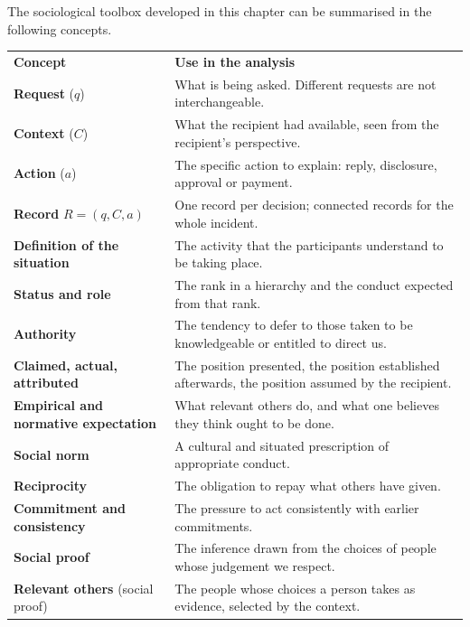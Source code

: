 The sociological toolbox developed in this chapter can be summarised in the following concepts.

\begin{table}[htbp]
	\centering
	\small
	\renewcommand{\arraystretch}{1.2}
	\begin{tabular}{@{}>{\raggedright\arraybackslash}p{} >{\raggedright\arraybackslash}p{}@{}}
		\arrayrulecolor{black!70}\hline
		\textbf{Concept} & \textbf{Use in the analysis} \\
		\arrayrulecolor{black!20}\hline
		\textbf{Request} ($q$) & What is being asked. Different requests are not interchangeable. \\
		\hline
		\textbf{Context} ($C$) & What the recipient had available, seen from the recipient's perspective. \\
		\hline
		\textbf{Action} ($a$) & The specific action to explain: reply, disclosure, approval or payment. \\
		\hline
		\textbf{Record} $R = (q, C, a)$ & One record per decision; connected records for the whole incident. \\
		\hline
		\textbf{Definition of the situation} & The activity that the participants understand to be taking place. \\
		\hline
		\textbf{Status and role} & The rank in a hierarchy and the conduct expected from that rank. \\
		\hline
		\textbf{Authority} & The tendency to defer to those taken to be knowledgeable or entitled to direct us. \\
		\hline
		\textbf{Claimed, actual, attributed} & The position presented, the position established afterwards, the position assumed by the recipient. \\
		\hline
		\textbf{Empirical and normative expectation} & What relevant others do, and what one believes they think ought to be done. \\
		\hline
		\textbf{Social norm} & A cultural and situated prescription of appropriate conduct. \\
		\hline
		\textbf{Reciprocity} & The obligation to repay what others have given. \\
		\hline
		\textbf{Commitment and consistency} & The pressure to act consistently with earlier commitments. \\
		\hline
		\textbf{Social proof} & The inference drawn from the choices of people whose judgement we respect. \\
		\hline
		\textbf{Relevant others} (social proof) & The people whose choices a person takes as evidence, selected by the context. \\

\end{tabular}
\end{table}
